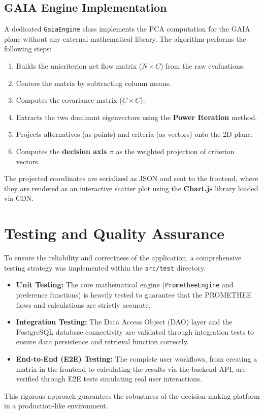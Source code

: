 \documentclass[12pt,a4paper,oneside]{report}
\begin{document}
\subsection{GAIA Engine Implementation}
A dedicated \texttt{GaiaEngine} class implements the PCA computation for the GAIA plane without any external mathematical library. The algorithm performs the following steps:
\begin{enumerate}
    \item Builds the unicriterion net flow matrix ($N \times C$) from the raw evaluations.
    \item Centers the matrix by subtracting column means.
    \item Computes the covariance matrix ($C \times C$).
    \item Extracts the two dominant eigenvectors using the \textbf{Power Iteration} method.
    \item Projects alternatives (as points) and criteria (as vectors) onto the 2D plane.
    \item Computes the \textbf{decision axis $\pi$} as the weighted projection of criterion vectors.
\end{enumerate}
The projected coordinates are serialized as JSON and sent to the frontend, where they are rendered as an interactive scatter plot using the \textbf{Chart.js} library loaded via CDN.

\section{Testing and Quality Assurance}
To ensure the reliability and correctness of the application, a comprehensive testing strategy was implemented within the \texttt{src/test} directory. 
\begin{itemize}
    \item \textbf{Unit Testing:} The core mathematical engine (\texttt{PrometheeEngine} and preference functions) is heavily tested to guarantee that the PROMETHEE flows and calculations are strictly accurate.
    \item \textbf{Integration Testing:} The Data Access Object (DAO) layer and the PostgreSQL database connectivity are validated through integration tests to ensure data persistence and retrieval function correctly.
    \item \textbf{End-to-End (E2E) Testing:} The complete user workflows, from creating a matrix in the frontend to calculating the results via the backend API, are verified through E2E tests simulating real user interactions.
\end{itemize}
This rigorous approach guarantees the robustness of the decision-making platform in a production-like environment.
\end{document}
